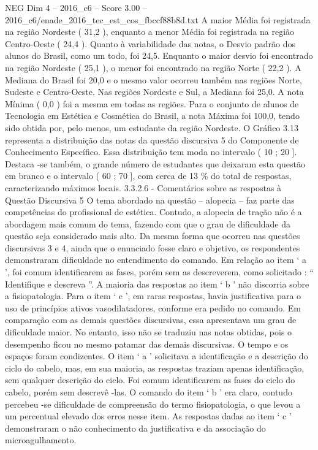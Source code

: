 \begin{textsample}{NEG Dim 4 – 2016\_c6 – Score 3.00 – 2016\_c6/enade\_2016\_tec\_est\_cos\_fbccf88b8d.txt}
A maior Média foi registrada na região Nordeste ( 31,2 ), enquanto a menor Média foi registrada na região Centro-Oeste ( 24,4 ).
Quanto à variabilidade das notas, o Desvio padrão dos alunos do Brasil, como um todo, foi 24,5.
Enquanto o maior desvio foi encontrado na região Nordeste ( 25,1 ), o menor foi encontrado na região Norte ( 22,2 ).
A Mediana do Brasil foi 20,0 e o mesmo valor ocorreu também nas regiões Norte, Sudeste e Centro-Oeste.
Nas regiões Nordeste e Sul, a Mediana foi 25,0.
A nota Mínima ( 0,0 ) foi a mesma em todas as regiões.
Para o conjunto de alunos de Tecnologia em Estética e Cosmética do Brasil, a nota Máxima foi 100,0, tendo sido obtida por, pelo menos, um estudante da região Nordeste.
O Gráfico 3.13 representa a distribuição das notas da questão discursiva 5 do Componente de Conhecimento Específico.
Essa distribuição tem moda no intervalo ( 10 ; 20 ].
Destaca -se também, o grande número de estudantes que deixaram esta questão em branco e o intervalo ( 60 ; 70 ], com cerca de 13 \% do total de respostas, caracterizando máximos locais. 3.3.2.6 - Comentários sobre as respostas à Questão Discursiva 5 O tema abordado na questão – alopecia – faz parte das competências do profissional de estética.
Contudo, a alopecia de tração não é a abordagem mais comum do tema, fazendo com que o grau de dificuldade da questão seja considerado mais alto.
Da mesma forma que ocorreu nas questões discursivas 3 e 4, ainda que o enunciado fosse claro e objetivo, os respondentes demonstraram dificuldade no entendimento do comando.
Em relação ao item ‘ a ’, foi comum identificarem as fases, porém sem as descreverem, como solicitado : “ Identifique e descreva ”.
A maioria das respostas ao item ‘ b ’ não discorria sobre a fisiopatologia.
Para o item ‘ c ’, em raras respostas, havia justificativa para o uso de princípios ativos vasodilatadores, conforme era pedido no comando.
Em comparação com as demais questões discursivas, essa apresentava um grau de dificuldade maior.
No entanto, isso não se traduziu nas notas obtidas, pois o desempenho ficou no mesmo patamar das demais discursivas.
O tempo e os espaços foram condizentes.
O item ‘ a ’ solicitava a identificação e a descrição do ciclo do cabelo, mas, em sua maioria, as respostas traziam apenas identificação, sem qualquer descrição do ciclo.
Foi comum identificarem as fases do ciclo do cabelo, porém sem descrevê -las.
O comando do item ‘ b ’ era claro, contudo percebeu -se dificuldade de compreensão do termo fisiopatologia, o que levou a um percentual elevado dos erros nesse item.
As respostas dadas ao item ‘ c ’ demonstraram o não conhecimento da justificativa e da associação do microagulhamento.

\end{textsample}
